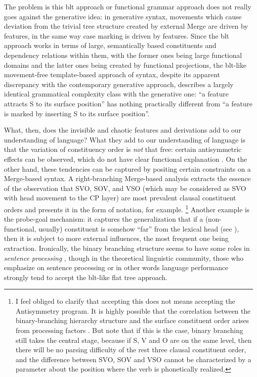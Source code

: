 \documentclass[../main.tex]{subfiles}
\begin{document}
The problem is this \ac{blt} approach or functional grammar approach
does not really goes against the generative idea:
in generative syntax, movements which cause deviation 
from the trivial tree structure created by external Merge 
are driven by features, 
in the same way case marking is driven by features.
Since the \ac{blt} approach works in terms of large, semantically based constituents 
and dependency relations within them,
with the former ones being large functional domains 
and the latter ones being created by functional projections,
the \ac{blt}-like movement-free template-based approach of syntax,
despite its apparent discrepancy with the contemporary generative approach,
describes a largely identical grammatical complexity class with the generative one:
``a feature attracts S to its surface position''
has nothing practically different from ``a feature is marked by inserting S to its surface position''.

What, then, does the invisible and chaotic features and derivations add to our understanding of language?
What they add to our understanding of language 
is that the variation of constituency order is \emph{not} that free:
certain antisymmetric effects can be observed,
which do not have clear functional explanation \citep{cinque2014typological}.
On the other hand, these tendencies can be captured by positing certain constraints on a Merge-based syntax.
A right-branching Merge-based analysis extracts the essence of the observation 
that SVO, SOV, and VSO (which may be considered as SVO with head movement to the CP layer) 
are most prevalent clausal constituent orders
and presents it in the form of notation, for example.%
\footnote{
    I feel obliged to clarify that accepting this does not means accepting the Antisymmetry program.
    It is highly possible that the correlation between the binary-branching hierarchy structure 
    and the surface constituent order 
    arises from processing factors \citep{zeijlstra2022fofc}.
    But note that if this is the case, 
    binary branching still takes the central stage,
    because if S, V and O are on the same level, 
    then there will be no parsing difficulty of the rest three clausal constituent order,
    and the difference between SVO, SOV and VSO cannot be characterized by a parameter 
    about the position where the verb is phonetically realized. 
}
Another example is the probe-goal mechanism:
it captures the generalization that 
if a (non-functional, usually) constituent is 
somehow ``far'' from the lexical head (see ),
then it is subject to more external influences,
the most frequent one being extraction.
Ironically, the binary branching structure seems to have some roles in 
\emph{sentence processing} \citep{newmeyer2003basic,nelson2017neurophysiological},
though in the theoretical linguistic community,
those who emphasize on sentence processing or in other words language performance 
strongly tend to accept the \ac{blt}-like flat tree approach.
\end{document}
